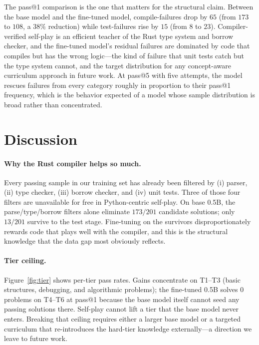 \documentclass[11pt,a4paper]{article}
\begin{document}
The pass@1 comparison is the one that matters for the structural claim. Between the base model and the fine-tuned model, compile-failures drop by $65$ (from $173$ to $108$, a $38\%$ reduction) while test-failures rise by $15$ (from $8$ to $23$). Compiler-verified self-play is an efficient teacher of the Rust type system and borrow checker, and the fine-tuned model's residual failures are dominated by code that compiles but has the wrong logic---the kind of failure that unit tests catch but the type system cannot, and the target distribution for any concept-aware curriculum approach in future work. At pass@5 with five attempts, the model rescues failures from every category roughly in proportion to their pass@1 frequency, which is the behavior expected of a model whose sample distribution is broad rather than concentrated.

\section{Discussion}

\paragraph{Why the Rust compiler helps so much.}
Every passing sample in our training set has already been filtered by (i) parser, (ii) type checker, (iii) borrow checker, and (iv) unit tests. Three of those four filters are unavailable for free in Python-centric self-play. On base 0.5B, the parse/type/borrow filters alone eliminate $173/201$ candidate solutions; only $13/201$ survive to the test stage. Fine-tuning on the survivors disproportionately rewards code that plays well with the compiler, and this is the structural knowledge that the data gap most obviously reflects.

\paragraph{Tier ceiling.}
Figure~\ref{fig:tier} shows per-tier pass rates. Gains concentrate on T1--T3 (basic structures, debugging, and algorithmic problems); the fine-tuned 0.5B solves $0$ problems on T4--T6 at pass@1 because the base model itself cannot seed any passing solutions there. Self-play cannot lift a tier that the base model never enters. Breaking that ceiling requires either a larger base model or a targeted curriculum that re-introduces the hard-tier knowledge externally---a direction we leave to future work.
\end{document}

